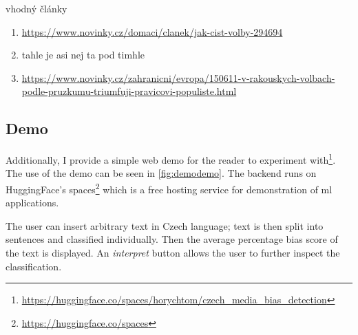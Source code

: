 vhodný články
\begin{enumerate}
    \item \url{https://www.novinky.cz/domaci/clanek/jak-cist-volby-294694}
    \item tahle je asi nej ta pod timhle
    \item \url{https://www.novinky.cz/zahranicni/evropa/150611-v-rakouskych-volbach-podle-pruzkumu-triumfuji-pravicovi-populiste.html}
\end{enumerate}

\subsection{Demo}
Additionally, I provide a simple web demo for the reader to experiment with\footnote{\url{https://huggingface.co/spaces/horychtom/czech_media_bias_detection}}. The use of the demo can be seen in \ref{fig:demodemo}. The backend runs on HuggingFace's spaces\footnote{\url{https://huggingface.co/spaces}} which is a free hosting service for demonstration of \gls{ml} applications. 

The user can insert arbitrary text in Czech language; text is then split into sentences and classified individually. Then the average percentage bias score of the text is displayed. An \textit{interpret} button allows the user to further inspect the classification.

\begin{figure}
\end{figure}
